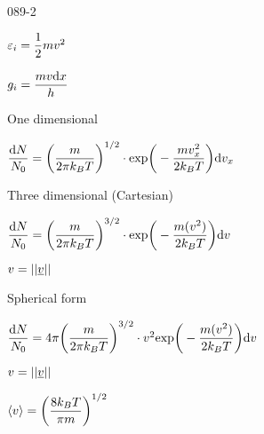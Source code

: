 \begin{mitframe}{089-2}
    
\begin{listone}
	\item $\varepsilon_{\state}=\dfrac{1}{2}\mass\vvel^2$
    \item $\grav_{\state}=\dfrac{\mass\vvel\mathrm{d}\disp}{\heattranscoeff}$
    \item One dimensional
	
    \begin{listtwo}
    	\item $\dfrac{\mathrm{d}\nummoles}{\nummoles_{\init}}=\bigg(\dfrac{\mass}{2\pi\boltz\Temp}\bigg)^{1/2}\cdot\text{exp}{\bigg(-\dfrac{\mass\vvel_{\disp}^2}{2\boltz\Temp}\bigg)}\mathrm{d}\vvel_{\disp}$
		\end{listtwo}

	\item Three dimensional (Cartesian)
	
    \begin{listtwo}
    	\item $\dfrac{\mathrm{d}\nummoles}{\nummoles_{\init}}=\bigg(\dfrac{\mass}{2\pi\boltz\Temp}\bigg)^{3/2}\cdot\text{exp}\bigg(-\dfrac{\mass(\vvel^2)}{2\boltz\Temp}\bigg)\mathrm{d}\vvel$
    	\item $\vvel=||\uline{\vvel}||$
    \end{listtwo}
    
	\item Spherical form
    
    \begin{listtwo}
    	\item $\dfrac{\mathrm{d}\nummoles}{\nummoles_{\init}}=4\pi\bigg(\dfrac{\mass}{2\pi\boltz\Temp}\bigg)^{3/2}\cdot\vvel^2\text{exp}\bigg(-\dfrac{\mass(\vvel^2)}{2\boltz\Temp}\bigg)\mathrm{d}\vvel$
        \item $\vvel=||\uline{\vvel}||$
    \end{listtwo}
    
	\item $\langle\vvel\rangle=\bigg(\dfrac{8\boltz\Temp}{\pi\mass}\bigg)^{1/2}$
\end{listone}

\end{mitframe}